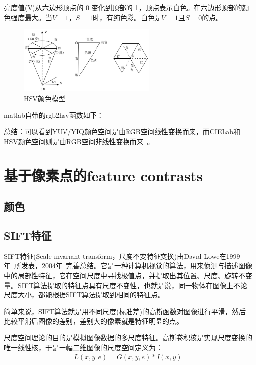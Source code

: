 \documentclass[12pt]{article}
\begin{document}
亮度值(V)从六边形顶点的 0 变化到顶部的 1，顶点表示白色。在六边形顶部的颜色强度最大。当$ V=1$，$S=1$时，有纯色彩。白色是$V=1$且$S=0$的点。

\begin{figure}[!ht]
\centering
\includegraphics[width=0.6\textwidth]{HSV.jpg}
\caption{HSV颜色模型}
\label{fig: HSV}
\end{figure} 

matlab自带的rgb2hsv函数如下：
 

总结：可以看到YUV/YIQ颜色空间是由RGB空间线性变换而来，而CIELab和HSV颜色空间则是由RGB空间非线性变换而来~\cite{kim2014salient}。

\section{基于像素点的feature contrasts}

\subsection{颜色}

\subsection{SIFT特征}

SIFT特征(Scale-invariant transform，尺度不变特征变换)由David Lowe在1999年~\cite{lowe1999object}所发表，2004年~\cite{lowe2004distinctive}完善总结。它是一种计算机视觉的算法，用来侦测与描述图像中的局部性特征，它在空间尺度中寻找极值点，并提取出其位置、尺度、旋转不变量。SIFT算法提取的特征点具有尺度不变性，也就是说，同一物体在图像上不论尺度大小，都能根据SIFT算法提取到相同的特征点。

简单来说，SIFT算法就是用不同尺度(标准差)的高斯函数对图像进行平滑，然后比较平滑后图像的差别，差别大的像素就是特征明显的点。

尺度空间理论的目的是模拟图像数据的多尺度特征。高斯卷积核是实现尺度变换的唯一线性核，于是一幅二维图像的尺度空间定义为：
\begin{align}
L(x, y, e) = G(x, y, e) * I(x, y)
\end{align}
\end{document}
